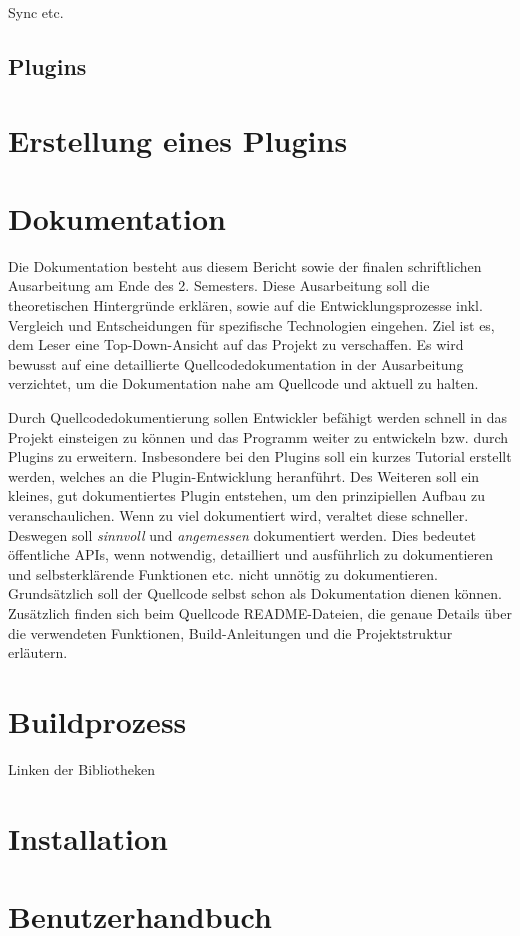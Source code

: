 Sync etc.

\subsection{Plugins}


\section{Erstellung eines Plugins}

\section{Dokumentation}

Die Dokumentation besteht aus diesem Bericht sowie der finalen schriftlichen Ausarbeitung am Ende des 2. Semesters.
Diese Ausarbeitung soll die theoretischen Hintergründe erklären, sowie auf die Entwicklungsprozesse inkl. Vergleich und Entscheidungen für spezifische Technologien eingehen.
Ziel ist es, dem Leser eine Top-Down-Ansicht auf das Projekt zu verschaffen.
Es wird bewusst auf eine detaillierte Quellcodedokumentation in der Ausarbeitung verzichtet, um die Dokumentation nahe am Quellcode und aktuell zu halten.

Durch Quellcodedokumentierung sollen Entwickler befähigt werden schnell in das Projekt einsteigen zu können und das Programm weiter zu entwickeln bzw. durch Plugins zu erweitern.
Insbesondere bei den Plugins soll ein kurzes Tutorial erstellt werden, welches an die Plugin-Entwicklung heranführt. 
Des Weiteren soll ein kleines, gut dokumentiertes Plugin entstehen, um den prinzipiellen Aufbau zu veranschaulichen.
Wenn zu viel dokumentiert wird, veraltet diese schneller.
Deswegen soll \emph{sinnvoll} und \emph{angemessen} dokumentiert werden.
Dies bedeutet öffentliche APIs, wenn notwendig, detailliert und ausführlich zu dokumentieren und selbsterklärende Funktionen etc. nicht unnötig zu dokumentieren.
Grundsätzlich soll der Quellcode selbst schon als Dokumentation dienen können.
Zusätzlich finden sich beim Quellcode README-Dateien, die genaue Details über die verwendeten Funktionen, Build-Anleitungen und die Projektstruktur erläutern.

\section{Buildprozess}

Linken der Bibliotheken

\section{Installation}

\section{Benutzerhandbuch}
































